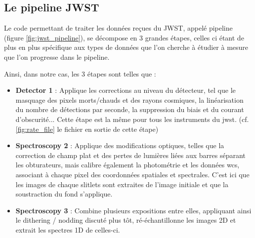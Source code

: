 \documentclass[11pt, a4paper]{article}
\begin{document}
\subsection{Le pipeline JWST}

Le code permettant de traiter les données reçues du JWST, appelé pipeline (figure \ref{fig:jwst_pipeline}), se décompose en 3 grandes étapes, celles ci étant de plus en plus spécifique aux types de données que l'on cherche à étudier à mesure que l'on progresse dans le pipeline.

Ainsi, dans notre cas, les 3 étapes sont telles que :\\


\begin{minipage}{.45\linewidth}
  \begin{itemize}[left=0cm]
    \item \textbf{Detector 1} : Applique les corrections au niveau du détecteur, tel que le masquage des pixels morts/chauds et des rayons cosmiques, la linéarisation du nombre de détections par seconde, la suppression du biais et du courant d'obscurité... Cette étape est la même pour tous les instruments du \gls{jwst}. (cf. \ref{fig:rate_file} le fichier en sortie de cette étape)
    \item \textbf{Spectroscopy 2} : Applique des modifications optiques, telles que la correction de champ plat et des pertes de lumières liées aux barres séparant les obturateurs, mais calibre également la photométrie et les données \gls{wcs}, associant à chaque pixel des coordonnées spatiales et spectrales. C'est ici que les images de chaque slitlets sont extraites de l'image initiale et que la soustraction du fond s'applique.
    \item \textbf{Spectroscopy 3} : Combine plusieurs expositions entre elles, appliquant ainsi le dithering / nodding discuté plus tôt, ré-échantillonne les images 2D et extrait les spectres 1D de celles-ci.
  \end{itemize}
  \end{minipage}
  \hfill
\end{document}
